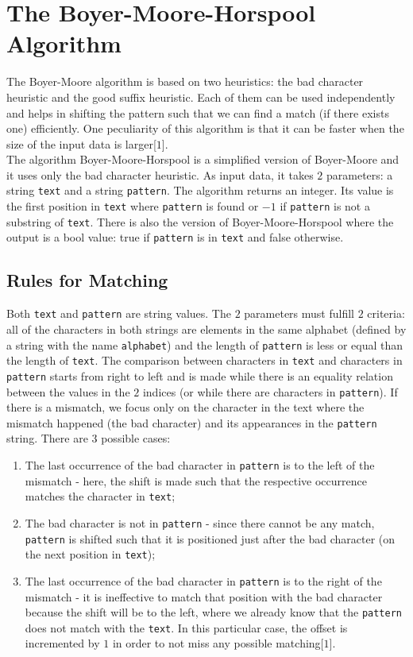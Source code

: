 \chapter{The Boyer-Moore-Horspool Algorithm}

The Boyer-Moore algorithm is based on two heuristics: the bad character heuristic and the good suffix heuristic. Each of them can be used independently and helps in shifting the pattern such that we can find a match (if there exists one) efficiently. One peculiarity of this algorithm is that it can be faster when the size of the input data is larger[\(1\)]. \\
\indent The algorithm Boyer-Moore-Horspool is a simplified version of Boyer-Moore and it uses only the bad character heuristic. As input data, it takes \(2\) parameters: a string \texttt{text} and a string \texttt{pattern}. The algorithm returns an integer. Its value is the first position in \texttt{text} where \texttt{pattern} is found or \(-1\) if \texttt{pattern} is not a substring of \texttt{text}. There is also the version of Boyer-Moore-Horspool where the output is a bool value: true if \texttt{pattern} is in \texttt{text} and false otherwise.

\section{Rules for Matching}

Both \texttt{text} and \texttt{pattern} are string values. The \(2\) parameters must fulfill \(2\) criteria: all of the characters in both strings are elements in the same alphabet (defined by a string with the name \texttt{alphabet}) and the length of \texttt{pattern} is less or equal than the length of \texttt{text}. The comparison between characters in \texttt{text} and characters in \texttt{pattern} starts from right to left and is made while there is an equality relation between the values in the \(2\) indices (or while there are characters in \texttt{pattern}). If there is a mismatch, we focus only on the character in the text where the mismatch happened (the bad character) and its appearances in the \texttt{pattern} string. There are \(3\) possible cases:
\begin{enumerate}
\item The last occurrence of the bad character in \texttt{pattern} is to the left of the mismatch - here, the shift is made such that the respective occurrence matches the character in \texttt{text};
\item The bad character is not in \texttt{pattern} - since there cannot be any match, \texttt{pattern} is shifted such that it is positioned just after the bad character (on the next position in \texttt{text});
\item The last occurrence of the bad character in \texttt{pattern} is to the right of the mismatch - it is ineffective to match that position with the bad character because the shift will be to the left, where we already know that the \texttt{pattern} does not match with the \texttt{text}. In this particular case, the offset is incremented by \(1\) in order to not miss any possible matching[\(1\)].
\end{enumerate}


